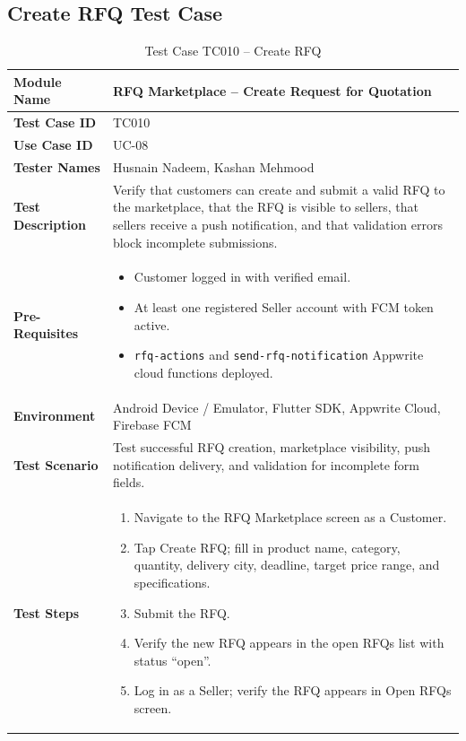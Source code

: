 \subsection{Create RFQ Test Case}

\begin{table}[H]
\centering
\caption{Test Case TC010 -- Create RFQ}
\label{tab:tc010}
\renewcommand{\arraystretch}{1.15}
\small
\begin{tabular}{|p{3.2cm}|p{10.8cm}|}
\hline
\textbf{Module Name} & RFQ Marketplace -- Create Request for Quotation \\ \hline
\textbf{Test Case ID} & TC010 \\ \hline
\textbf{Use Case ID} & UC-08 \\ \hline
\textbf{Tester Names} & Husnain Nadeem, Kashan Mehmood \\ \hline
\textbf{Test Description} & Verify that customers can create and submit a valid RFQ to the marketplace, that the RFQ is visible to sellers, that sellers receive a push notification, and that validation errors block incomplete submissions. \\ \hline
\textbf{Pre-Requisites} &
\begin{itemize}[leftmargin=*,noitemsep]
\item Customer logged in with verified email.
\item At least one registered Seller account with FCM token active.
\item \texttt{rfq-actions} and \texttt{send-rfq-notification} Appwrite cloud functions deployed.
\end{itemize} \\ \hline
\textbf{Environment} & Android Device / Emulator, Flutter SDK, Appwrite Cloud, Firebase FCM \\ \hline
\textbf{Test Scenario} & Test successful RFQ creation, marketplace visibility, push notification delivery, and validation for incomplete form fields. \\ \hline
\textbf{Test Steps} &
\begin{enumerate}[leftmargin=*,noitemsep]
\item Navigate to the RFQ Marketplace screen as a Customer.
\item Tap Create RFQ; fill in product name, category, quantity, delivery city, deadline, target price range, and specifications.
\item Submit the RFQ.
\item Verify the new RFQ appears in the open RFQs list with status ``open''.
\item Log in as a Seller; verify the RFQ appears in Open RFQs screen.

\end{enumerate}
\end{tabular}
\end{table}
